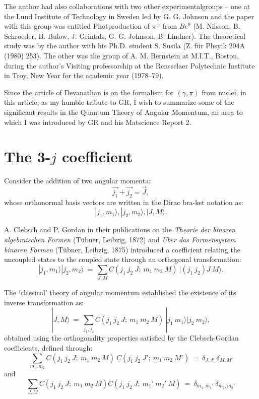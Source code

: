 The author had also collaborations with two other experimental\break groups -- one at the Lund Institute of Technology in Sweden led by G. G. Johnson and the paper with this group was  entitled Photproduction of $\pi^+$ from $Be^9$ (M. Nilsson, B. Schroeder, B. Bulow, J. Grintals, G. G. Johnson, B. Lindner). The theoretical study was by the author with his Ph.D. student S. Susila (Z. für Phsyik 294A (1980) 253). The other was the group of A. M. Bernstein at M.I.T., Boston, during the author's Visiting professorship at the Rensselaer Polytechnic Institute in Troy, New Year for the academic year (1978--79).

Since the article of Devanathan is on the formalism for $(\gamma,\pi)$ from nuclei, in this article, as my humble tribute to GR, I wish to summarize some of the significant results in the Quantum Theory of Angular Momentum, an area to which I was introduced by GR and his Matscience Report 2.

\section*{The 3-$j$ coefficient}

Consider the addition of two angular momenta:
\makeatletter
{}
\makeatother
\begin{equation}
\vec{j_1} + \vec{j_2} = \vec{J}, \label{chap7-eq1} 
\end{equation}
whose orthonormal basis vectors are written in the Dirac bra-ket notation as:
\begin{equation} 
|j_1,m_1\rangle , |j_2,m_2\rangle, |J,M\rangle. \label{chap7-eq2}
\end{equation}

A. Clebsch and P. Gordan in their publications on the \textit{Theorie der binaren algebraischen Formen} (Tübner, Leibzig, 1872) and \textit{Uber das Formensystem binaren Formen} (Tübner, Leibzig, 1875) introduced a coefficient relating the uncoupled states to the coupled state through an orthogonal transformation:
\begin{equation}
|j_1,m_1\rangle|j_2,m_2\rangle\ =\ \sum_{J,M} C(j_1\ j_2\ J;\ m_1\ m_2\ M)\ |(j_1\ j_2)J\ M\rangle. \label{chap7-eq3}
\end{equation}

The `classical' theory of angular momentum established the existence of its inverse transformation as:
\begin{equation}
|J,M\rangle\ =\ \sum_{j_1,j_2} C(j_1\ j_2\ J;\ m_1\ m_2\ M)\ |j_1\ m_1\rangle |j _2\  m_2\rangle, \label{chap7-eq4}
\end{equation}
obtained using the orthogonality properties satisfied by the Clebsch-Gordan coefficients, defined through:
\begin{equation}
\sum_{m_1,m_2} C(j_1\ j_2\ J;\ m_1\ m_2\ M)\ C(j_1\ j_2\ J';\ m_1\ m_2\ M')\ =\ \delta_{J,J'}\ \delta_{M,M'} \label{chap7-eq5}
\end{equation}
and
\begin{equation}
\sum_{J,M} C(j_1\ j_2\ J;\ m_1\ m_2\ M)C(j_1\ j_2\ J;\ m_1'\ m_2'\ M)\ =\ \delta_{m_1,m_1'} \ \delta_{m_2,m_2'} \label{chap7-eq6}
\end{equation}

